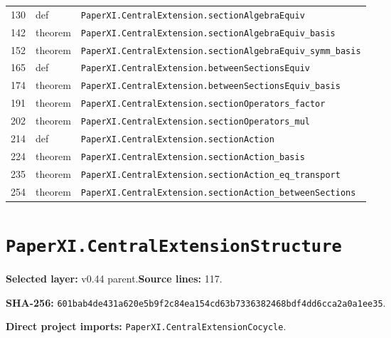 \documentclass[10pt,oneside]{book}
\begin{document}
\begin{longtable}{@{}p{}p{}p{}@{}}
130&def&\nolinkurl{PaperXI.CentralExtension.sectionAlgebraEquiv}\\

142&theorem&\nolinkurl{PaperXI.CentralExtension.sectionAlgebraEquiv_basis}\\

152&theorem&\nolinkurl{PaperXI.CentralExtension.sectionAlgebraEquiv_symm_basis}\\

165&def&\nolinkurl{PaperXI.CentralExtension.betweenSectionsEquiv}\\

174&theorem&\nolinkurl{PaperXI.CentralExtension.betweenSectionsEquiv_basis}\\

191&theorem&\nolinkurl{PaperXI.CentralExtension.sectionOperators_factor}\\

202&theorem&\nolinkurl{PaperXI.CentralExtension.sectionOperators_mul}\\

214&def&\nolinkurl{PaperXI.CentralExtension.sectionAction}\\

224&theorem&\nolinkurl{PaperXI.CentralExtension.sectionAction_basis}\\

235&theorem&\nolinkurl{PaperXI.CentralExtension.sectionAction_eq_transport}\\

254&theorem&\nolinkurl{PaperXI.CentralExtension.sectionAction_betweenSections}\\

\bottomrule\end{longtable}

\section{\texorpdfstring{\nolinkurl{PaperXI.CentralExtensionStructure}}{PaperXI.CentralExtensionStructure}}\label{module:PaperXI.CentralExtensionStructure}

\textbf{Selected layer:} v0.44 parent.\quad\textbf{Source lines:} 117.\par\textbf{SHA-256:} {\scriptsize\nolinkurl{601bab4de431a620e5b9f2c84ea154cd63b7336382468bdf4dd6cca2a0a1ee35}}.


\textbf{Direct project imports:} \nolinkurl{PaperXI.CentralExtensionCocycle}.
\end{document}
